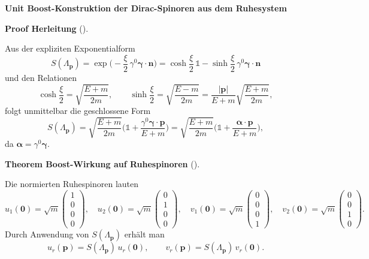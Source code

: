\documentclass[10pt, letterpaper]{article}
\newcommand{\CustomHeading}[3]{%
  \par\medskip\noindent%
  \textbf{#1 #2} \textnormal{(#3)}.\enskip%
}
\newenvironment{THEO}[2]{\begin{unitbox}\CustomHeading{Theorem}{#1}{#2}}{\end{unitbox}}
\newenvironment{PROOF}[2]{\begin{unitbox}\CustomHeading{Proof}{#1}{#2}}{\end{unitbox}}
\newenvironment{unit}[1]
  {\begin{unitbox}\textbf{Unit #1}\par\smallskip}
  {\end{unitbox}}
\begin{document}
\begin{unit}{Boost-Konstruktion der Dirac-Spinoren aus dem Ruhesystem}
\begin{PROOF}{Herleitung}{}
Aus der expliziten Exponentialform
\[
S(\Lambda_{\mathbf p})=\exp\!\Big(-\frac{\xi}{2}\,\gamma^0\boldsymbol{\gamma}\cdot\mathbf n\Big)
=\cosh\frac{\xi}{2}\,\mathbb 1 - \sinh\frac{\xi}{2}\,\gamma^0\boldsymbol{\gamma}\cdot\mathbf n
\]
und den Relationen
\[
\cosh\frac{\xi}{2}=\sqrt{\frac{E+m}{2m}},\qquad
\sinh\frac{\xi}{2}=\sqrt{\frac{E-m}{2m}}
=\frac{|\mathbf p|}{E+m}\sqrt{\frac{E+m}{2m}},
\]
folgt unmittelbar die geschlossene Form
\[
S(\Lambda_{\mathbf p})
=\sqrt{\frac{E+m}{2m}}\Big(\mathbb 1 + \frac{\gamma^0\boldsymbol{\gamma}\cdot\mathbf p}{E+m}\Big)
=\sqrt{\frac{E+m}{2m}}\Big(\mathbb 1 + \frac{\boldsymbol{\alpha}\cdot\mathbf p}{E+m}\Big),
\]
da $\boldsymbol{\alpha}=\gamma^0\boldsymbol{\gamma}$.
\end{PROOF}

\begin{THEO}{Boost-Wirkung auf Ruhespinoren}{}
Die normierten Ruhespinoren lauten
\[
u_1(\mathbf 0)=\sqrt{m}\begin{pmatrix}1\\0\\0\\0\end{pmatrix},\quad
u_2(\mathbf 0)=\sqrt{m}\begin{pmatrix}0\\1\\0\\0\end{pmatrix},\quad
v_1(\mathbf 0)=\sqrt{m}\begin{pmatrix}0\\0\\0\\1\end{pmatrix},\quad
v_2(\mathbf 0)=\sqrt{m}\begin{pmatrix}0\\0\\1\\0\end{pmatrix}.
\]
Durch Anwendung von $S(\Lambda_{\mathbf p})$ erhält man
\[
u_r(\mathbf p)=S(\Lambda_{\mathbf p})\,u_r(\mathbf 0),\qquad
v_r(\mathbf p)=S(\Lambda_{\mathbf p})\,v_r(\mathbf 0).
\]
\end{THEO}


\end{unit}
\end{document}
